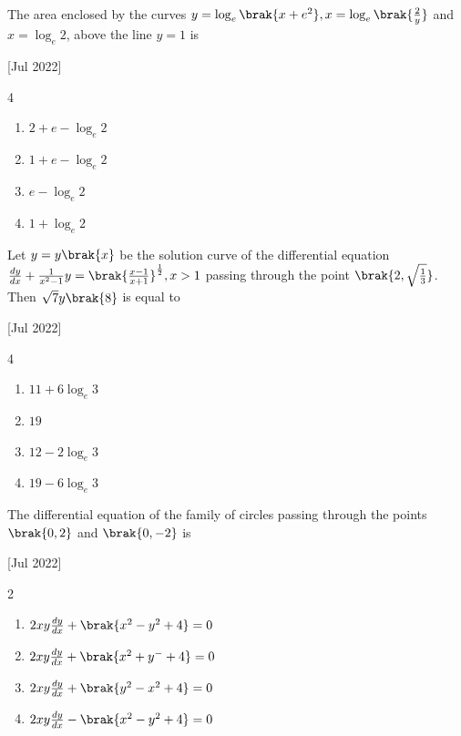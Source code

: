     \item The area enclosed by the curves $y=\log_e\brak{x+e^2},x=\log_e\brak{\frac{2}{y}}$ and $x=\log_e2$, above the line $y=1$ is
    
    \hfill{[Jul 2022]}

        \begin{multicols}{4}
            \begin{enumerate}
                \item $2+e-\log_e2$
                \item $1+e-\log_e2$
                \item $e-\log_e2$
                \item $1+\log_e2$
            \end{enumerate}
        \end{multicols}
        
    \item Let $y=y\brak{x}$ be the solution curve of the differential equation $\frac{dy}{dx}+\frac{1}{x^2-1}y=\brak{\frac{x-1}{x+1}}^{\frac{1}{2}},x>1$ passing through the point $\brak{2,\sqrt{\frac{1}{3}}}$. Then $\sqrt{7}y\brak{8}$ is equal to
    
    \hfill{[Jul 2022]}

        \begin{multicols}{4}
            \begin{enumerate}
                \item $11+6\log_e3$
                \item $19$
                \item $12-2\log_e3$
                \item $19-6\log_e3$
            \end{enumerate}
        \end{multicols}

    \item The differential equation of the family of circles passing through the points $\brak{0,2}$ and $\brak{0,-2}$ is
    
    \hfill{[Jul 2022]}

        \begin{multicols}{2}
            \begin{enumerate}
                \item $2xy\frac{dy}{dx}+\brak{x^2-y^2+4}=0$
                \item $2xy\frac{dy}{dx}+\brak{x^2+y^-+4}=0$
                \item $2xy\frac{dy}{dx}+\brak{y^2-x^2+4}=0$
                \item $2xy\frac{dy}{dx}-\brak{x^2-y^2+4}=0$
            \end{enumerate}
        \end{multicols}
        
